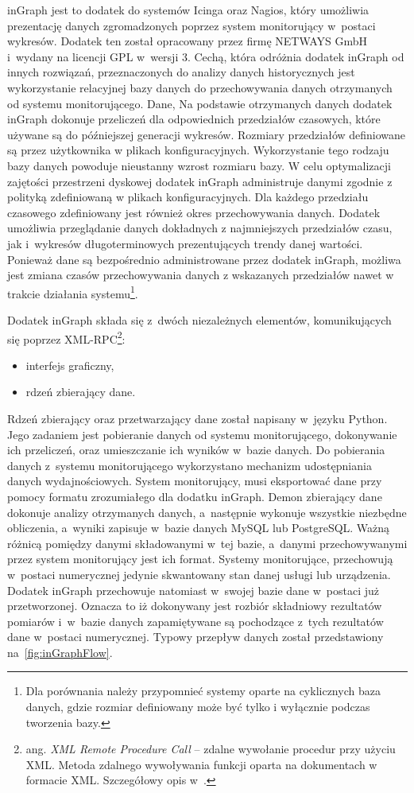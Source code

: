 inGraph jest to dodatek do systemów Icinga oraz Nagios, który
umożliwia prezentację danych zgromadzonych poprzez system monitorujący
w~postaci wykresów. Dodatek ten został opracowany przez firmę NETWAYS
GmbH i~wydany na licencji GPL w~wersji 3. Cechą, która odróżnia
dodatek inGraph od innych rozwiązań, przeznaczonych do analizy danych
historycznych jest wykorzystanie relacyjnej bazy danych do
przechowywania danych otrzymanych od systemu monitorującego. Dane, Na
podstawie otrzymanych danych dodatek inGraph dokonuje przeliczeń dla
odpowiednich przedziałów czasowych, które używane są do późniejszej
generacji wykresów. Rozmiary przedziałów definiowane są przez
użytkownika w plikach konfiguracyjnych. Wykorzystanie tego rodzaju
bazy danych powoduje nieustanny wzrost rozmiaru bazy. W celu
optymalizacji zajętości przestrzeni dyskowej dodatek inGraph
administruje danymi zgodnie z polityką zdefiniowaną w plikach
konfiguracyjnych. Dla każdego przedziału czasowego zdefiniowany jest
również okres przechowywania danych. Dodatek umożliwia przeglądanie
danych dokładnych z najmniejszych przedziałów czasu, jak i~wykresów
długoterminowych prezentujących trendy danej wartości. Ponieważ dane
są bezpośrednio administrowane przez dodatek inGraph, możliwa jest
zmiana czasów przechowywania danych z wskazanych przedziałów nawet w
trakcie działania systemu\footnote{Dla porównania należy przypomnieć
  systemy oparte na cyklicznych baza danych, gdzie rozmiar definiowany
  może być tylko i wyłącznie podczas tworzenia bazy.}.

Dodatek inGraph składa się z~dwóch niezależnych elementów,
komunikujących się poprzez XML-RPC\footnote{ang. {\em XML Remote
    Procedure Call} -- zdalne wywołanie procedur przy użyciu
  XML. Metoda zdalnego wywoływania funkcji oparta na dokumentach w
  formacie XML. Szczegółowy opis w~\cite{www:XMLRPC}.}:

\begin{itemize}
\item interfejs graficzny,
\item rdzeń zbierający dane.
\end{itemize}

Rdzeń zbierający oraz przetwarzający dane został napisany w~języku
Python. Jego zadaniem jest pobieranie danych od systemu
monitorującego, dokonywanie ich przeliczeń, oraz umieszczanie ich
wyników w~bazie danych. Do pobierania danych z~systemu monitorującego
wykorzystano mechanizm udostępniania danych wydajnościowych. System
monitorujący, musi eksportować dane przy pomocy formatu zrozumiałego
dla dodatku inGraph. Demon zbierający dane dokonuje analizy
otrzymanych danych, a~następnie wykonuje wszystkie niezbędne
obliczenia, a~wyniki zapisuje w~bazie danych MySQL lub
PostgreSQL. Ważną różnicą pomiędzy danymi składowanymi w~tej bazie,
a~danymi przechowywanymi przez system monitorujący jest ich
format. Systemy monitorujące, przechowują w~postaci numerycznej
jedynie skwantowany stan danej usługi lub urządzenia. Dodatek inGraph
przechowuje natomiast w~swojej bazie dane w~postaci już
przetworzonej. Oznacza to iż dokonywany jest rozbiór składniowy
rezultatów pomiarów i~w~bazie danych zapamiętywane są pochodzące
z~tych rezultatów dane w~postaci numerycznej. Typowy przepływ danych
został przedstawiony na~\ref{fig:inGraphFlow}.

